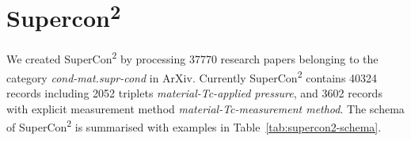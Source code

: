 \documentclass[]{interact}
\theoremstyle{plain}%
\theoremstyle{definition}
\theoremstyle{remark}
\begin{document}
\section{Supercon\textsuperscript{2}}

We created SuperCon\textsuperscript{2} by processing 37770 research papers belonging to the category \textit{cond-mat.supr-cond} in ArXiv. 
Currently SuperCon\textsuperscript{2} contains 40324 records including 2052 triplets \textit{material-Tc-applied pressure}, and 3602 records with explicit measurement method \textit{material-Tc-measurement method}.
The schema of SuperCon\textsuperscript{2} is summarised with examples in Table~\ref{tab:supercon2-schema}. 
\end{document}
